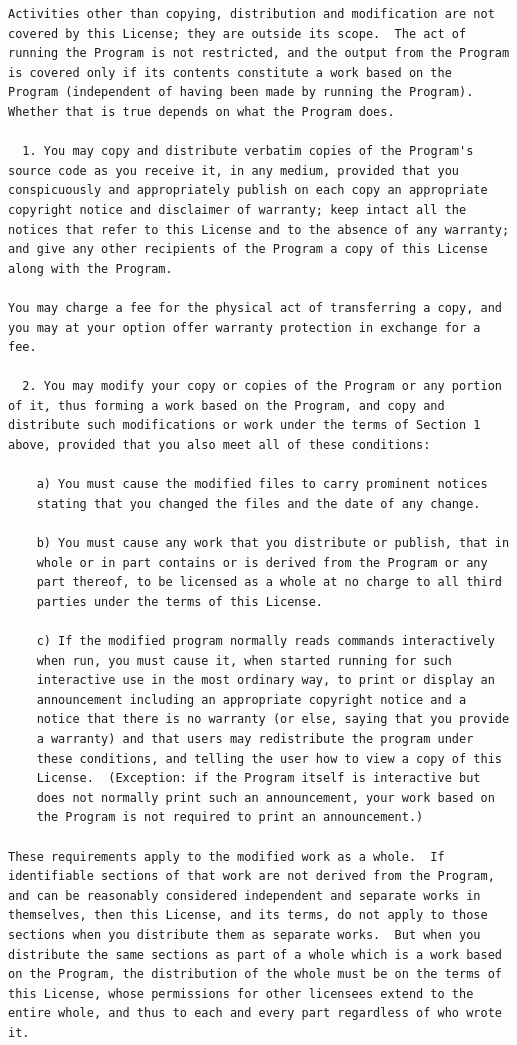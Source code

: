 \documentclass[mingoth,a4paper]{jsarticle}
\begin{document}
{{{{{\begin{multicols}{2}
\begin{fontsize}{6}{6}
\begin{verbatim}
Activities other than copying, distribution and modification are not
covered by this License; they are outside its scope.  The act of
running the Program is not restricted, and the output from the Program
is covered only if its contents constitute a work based on the
Program (independent of having been made by running the Program).
Whether that is true depends on what the Program does.

  1. You may copy and distribute verbatim copies of the Program's
source code as you receive it, in any medium, provided that you
conspicuously and appropriately publish on each copy an appropriate
copyright notice and disclaimer of warranty; keep intact all the
notices that refer to this License and to the absence of any warranty;
and give any other recipients of the Program a copy of this License
along with the Program.

You may charge a fee for the physical act of transferring a copy, and
you may at your option offer warranty protection in exchange for a fee.

  2. You may modify your copy or copies of the Program or any portion
of it, thus forming a work based on the Program, and copy and
distribute such modifications or work under the terms of Section 1
above, provided that you also meet all of these conditions:

    a) You must cause the modified files to carry prominent notices
    stating that you changed the files and the date of any change.

    b) You must cause any work that you distribute or publish, that in
    whole or in part contains or is derived from the Program or any
    part thereof, to be licensed as a whole at no charge to all third
    parties under the terms of this License.

    c) If the modified program normally reads commands interactively
    when run, you must cause it, when started running for such
    interactive use in the most ordinary way, to print or display an
    announcement including an appropriate copyright notice and a
    notice that there is no warranty (or else, saying that you provide
    a warranty) and that users may redistribute the program under
    these conditions, and telling the user how to view a copy of this
    License.  (Exception: if the Program itself is interactive but
    does not normally print such an announcement, your work based on
    the Program is not required to print an announcement.)

These requirements apply to the modified work as a whole.  If
identifiable sections of that work are not derived from the Program,
and can be reasonably considered independent and separate works in
themselves, then this License, and its terms, do not apply to those
sections when you distribute them as separate works.  But when you
distribute the same sections as part of a whole which is a work based
on the Program, the distribution of the whole must be on the terms of
this License, whose permissions for other licensees extend to the
entire whole, and thus to each and every part regardless of who wrote it.


\end{verbatim}
\end{fontsize}
\end{multicols}}}}}}
\end{document}
